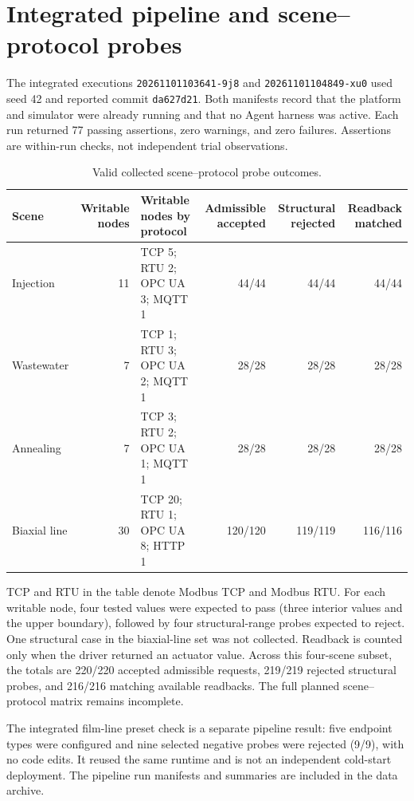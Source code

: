 \documentclass[10pt]{article}
\begin{document}
\section*{Integrated pipeline and scene--protocol probes}
The integrated executions \texttt{20261101103641-9j8} and \texttt{20261101104849-xu0} used seed 42 and reported commit \texttt{da627d21}. Both manifests record that the platform and simulator were already running and that no Agent harness was active. Each run returned 77 passing assertions, zero warnings, and zero failures. Assertions are within-run checks, not independent trial observations.

\begin{table}[h]
\centering
\caption{Valid collected scene--protocol probe outcomes.}
\footnotesize
\setlength{\tabcolsep}{3pt}
\begin{tabularx}{\textwidth}{@{}>{\raggedright\arraybackslash}p{2.0cm}r X r r r@{}}
\toprule
Scene & Writable nodes & Writable nodes by protocol & Admissible accepted & Structural rejected & Readback matched \\
\midrule
Injection & 11 & TCP 5; RTU 2; OPC UA 3; MQTT 1 & 44/44 & 44/44 & 44/44 \\
Wastewater & 7 & TCP 1; RTU 3; OPC UA 2; MQTT 1 & 28/28 & 28/28 & 28/28 \\
Annealing & 7 & TCP 3; RTU 2; OPC UA 1; MQTT 1 & 28/28 & 28/28 & 28/28 \\
Biaxial line & 30 & TCP 20; RTU 1; OPC UA 8; HTTP 1 & 120/120 & 119/119 & 116/116 \\
\bottomrule
\end{tabularx}
\end{table}

TCP and RTU in the table denote Modbus TCP and Modbus RTU. For each writable node, four tested values were expected to pass (three interior values and the upper boundary), followed by four structural-range probes expected to reject. One structural case in the biaxial-line set was not collected. Readback is counted only when the driver returned an actuator value. Across this four-scene subset, the totals are 220/220 accepted admissible requests, 219/219 rejected structural probes, and 216/216 matching available readbacks. The full planned scene--protocol matrix remains incomplete.

The integrated film-line preset check is a separate pipeline result: five endpoint types were configured and nine selected negative probes were rejected (9/9), with no code edits. It reused the same runtime and is not an independent cold-start deployment. The pipeline run manifests and summaries are included in the data archive.
\end{document}

